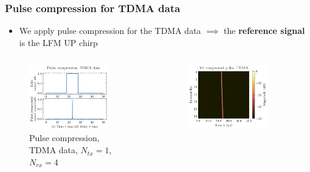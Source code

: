 \documentclass[UKenglish,8pt,aspectratio=1610]{beamer}
\begin{document}
\begin{frame}
\frametitle{Pulse compression for TDMA data}
\begin{itemize}
	\item We apply pulse compression for the TDMA data $\implies$ the \textbf{reference signal} is the LFM UP chirp
\end{itemize}
\begin{columns}
\begin{column}{0.5\textwidth}
	\begin{figure}[h!]
		\includegraphics[width=0.8\textwidth]{question1/plot_after_before_pulse_compression_tdma_channel_4_1_upchirp.pdf}
		\centering
		\caption{Pulse compression, TDMA data, $N_{tx}=1$, $N_{rx}=4$}
	\end{figure}
\end{column}
\begin{column}{0.5\textwidth}
		\begin{figure}[h!]
		\includegraphics[width=0.8\textwidth]{question1/tdma_all_compressed_pulses_upchirp_1.pdf}

\end{figure}
\end{column}
\end{columns}
\end{frame}
\end{document}

